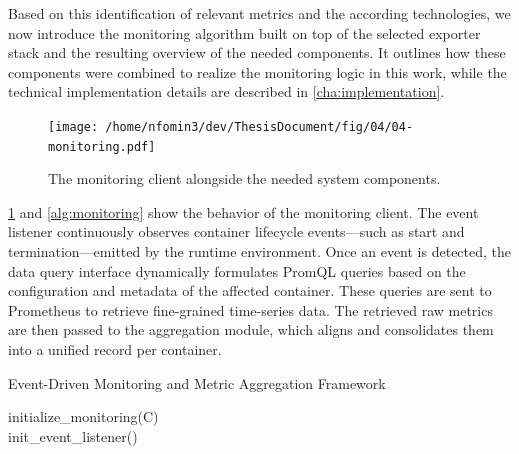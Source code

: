 Based on this identification of relevant metrics and the according technologies, we now introduce the monitoring algorithm built on top of the selected exporter stack and the resulting overview of the needed components. It outlines how these components were combined to realize the monitoring logic in this work, while the technical implementation details are described in \ref{cha:implementation}.

\begin{figure}[htbp]
    \centering
    \texttt{[image: /home/nfomin3/dev/ThesisDocument/fig/04/04-monitoring.pdf]} %
    \caption{The monitoring client alongside the needed system components.}
    \label{fig:monitoring_client}
\end{figure}

\ref{fig:monitoring_client} and \ref{alg:monitoring} show the behavior of the monitoring client. The event listener continuously observes container lifecycle events—such as start and termination—emitted by the runtime environment. Once an event is detected, the data query interface dynamically formulates PromQL queries based on the configuration and metadata of the affected container. These queries are sent to Prometheus to retrieve fine-grained time-series data. The retrieved raw metrics are then passed to the aggregation module, which aligns and consolidates them into a unified record per container.

\begin{algorithm}[H]
    \caption{Event-Driven Monitoring and Metric Aggregation Framework}
    \label{alg:monitoring}

    \BlankLine
    initialize\_monitoring(C)\\
    init\_event\_listener()\\
\end{algorithm}

